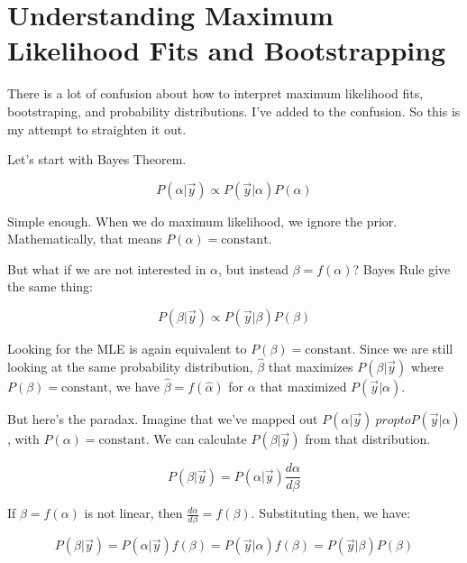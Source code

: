 \documentclass[11pt]{article}
\begin{document}

\section{Understanding Maximum Likelihood Fits and Bootstrapping}

There is a lot of confusion about how to interpret maximum likelihood fits, bootstraping, and probability distributions.
I've added to the confusion.
So this is my attempt to straighten it out.

Let's start with Bayes Theorem.

\begin{equation}
P(\alpha|\vec y) \propto P(\vec y|\alpha)P(\alpha)
\end{equation}

Simple enough. When we do maximum likelihood, we ignore the prior.
Mathematically, that means $P(\alpha) = \mathrm{constant}$.

But what if we are not interested in $\alpha$, but instead $\beta = f(\alpha)$?
Bayes Rule give the same thing:

\begin{equation}
P(\beta|\vec y) \propto P(\vec y|\beta)P(\beta)
\end{equation}

Looking for the MLE is again equivalent to $P(\beta) = \mathrm{constant}$.
Since we are still looking at the same probability distribution, $\hat \beta$ that maximizes $P(\beta|\vec y)$ where $P(\beta) = \mathrm{constant}$, we have $\hat\beta = f(\hat\alpha)$ for $\alpha$ that maximized $P(\vec y|\alpha)$. 

But here's the paradax.
Imagine that we've mapped out $P(\alpha|\vec y) \ propto P(\vec y|\alpha)$, with $P(\alpha) = \mathrm{constant}$.
We can calculate $P(\beta|\vec y)$ from that distribution.

\begin{equation}
P(\beta|\vec y) = P(\alpha|\vec y)\frac{d\alpha}{d\beta}
\end{equation}

If $\beta = f(\alpha)$ is not linear, then $\frac{d\alpha}{d\beta} = f(\beta)$.
Substituting then, we have:

\begin{equation}
P(\beta|\vec y) = P(\alpha|\vec y)f(\beta) = P(\vec y|\alpha)f(\beta) = P(\vec y|\beta)P(\beta)
\end{equation}
\end{document}
